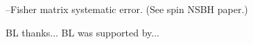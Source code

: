 \documentclass[prd,aps,letter,twocolumn,floatfix,notitlepage,nofootinbib]{revtex4-1}
\begin{document}
--Fisher matrix systematic error. (See spin NSBH paper.)





\begin{acknowledgments}

BL thanks... BL was supported by... 

\end{acknowledgments}


%     
  
\end{document}
